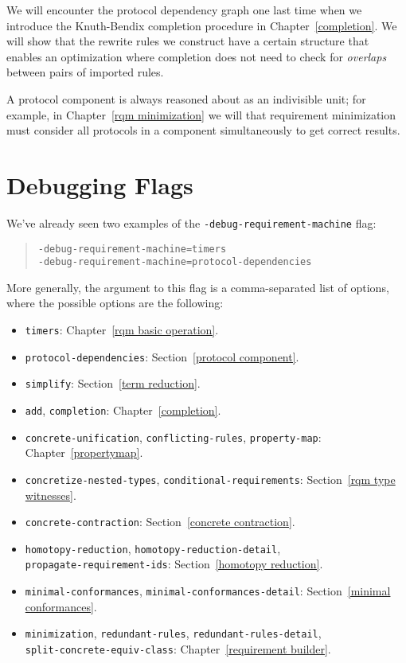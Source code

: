 \documentclass[../generics]{subfiles}
\begin{document}
We will encounter the protocol dependency graph one last time when we introduce the Knuth-Bendix completion procedure in Chapter~\ref{completion}. We will show that the rewrite rules we construct have a certain structure that enables an optimization where completion does not need to check for \emph{overlaps} between pairs of imported rules.

A protocol component is always reasoned about as an indivisible unit; for example, in Chapter~\ref{rqm minimization} we will that requirement minimization must consider all protocols in a component simultaneously to get correct results. 

\section{Debugging Flags}\label{rqm debugging flags}

We've already seen two examples of the \texttt{-debug-requirement-machine} flag:
\begin{quote}
\begin{verbatim}
-debug-requirement-machine=timers
-debug-requirement-machine=protocol-dependencies
\end{verbatim}
\end{quote}
More generally, the argument to this flag is a comma-separated list of options, where the possible options are the following:
\begin{itemize}
\item \texttt{timers}: Chapter~\ref{rqm basic operation}.
\item \texttt{protocol-dependencies}: Section~\ref{protocol component}.
\item \texttt{simplify}: Section~\ref{term reduction}.
\item \texttt{add}, \texttt{completion}: Chapter~\ref{completion}.
\item \texttt{concrete-unification}, \texttt{conflicting-rules}, \texttt{property-map}: Chapter~\ref{propertymap}.
\item \texttt{concretize-nested-types}, \texttt{conditional-requirements}: Section~\ref{rqm type witnesses}.
\item \texttt{concrete-contraction}: Section~\ref{concrete contraction}.
\item \texttt{homotopy-reduction}, \texttt{homotopy-reduction-detail},\\
\texttt{propagate-requirement-ids}: Section~\ref{homotopy reduction}.
\item \texttt{minimal-conformances}, \texttt{minimal-conformances-detail}: Section~\ref{minimal conformances}.
\item \texttt{minimization},  \texttt{redundant-rules}, \texttt{redundant-rules-detail},\\
\texttt{split-concrete-equiv-class}: Chapter~\ref{requirement builder}.
\end{itemize}
\end{document}

